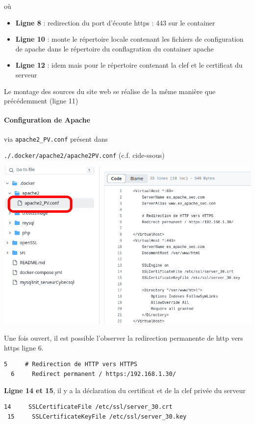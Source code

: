 \documentclass[french, 12pt]{article}%
\newcommand{\itemE}{\item[$\bullet$]}
\begin{document}
où 
\begin{itemize}
\itemE \textbf{Ligne 8} : redirection du port d'écoute https : 443 sur le container 
\itemE \textbf{Ligne 10} : monte le répertoire locale contenant les fichiers de configuration de apache dans le répertoire du conflagration du container apache
\itemE \textbf{Ligne 12} : idem mais pour le répertoire contenant la clef et le certificat du serveur 
\end{itemize}

Le montage des sources du site web se réalise de la même manière que précédemment (ligne 11)

\paragraph{Configuration de Apache} via \verb?apache2_PV.conf? présent dans 

\verb?./.docker/apache2/apache2PV.conf? (c.f. cide-ssous)

\begin{center}
\includegraphics[scale=0.5]{./ressource/apacheGitHttpsConf}
\end{center}

Une fois ouvert, il est possible l'observer la redirection permanente de http vers https  ligne 6.
\begin{lstlisting}[style=commande]
  5     # Redirection de HTTP vers HTTPS
  6     Redirect permanent / https:/192.168.1.30/
\end{lstlisting}

\textbf{Ligne 14 et 15}, il y a la déclaration du certificat et de la clef privée du serveur 
\begin{lstlisting}[style=commande]
 14     SSLCertificateFile /etc/ssl/server_30.crt
 15     SSLCertificateKeyFile /etc/ssl/server_30.key
\end{lstlisting}
\end{document}
